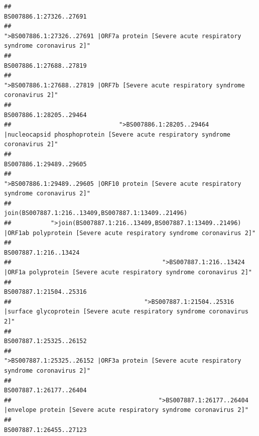 \documentclass[
]{article}
\begin{document}
\begin{verbatim}
##                                                                                                                BS007886.1:27326..27691 
##                                            ">BS007886.1:27326..27691 |ORF7a protein [Severe acute respiratory syndrome coronavirus 2]" 
##                                                                                                                BS007886.1:27688..27819 
##                                                    ">BS007886.1:27688..27819 |ORF7b [Severe acute respiratory syndrome coronavirus 2]" 
##                                                                                                                BS007886.1:28205..29464 
##                              ">BS007886.1:28205..29464 |nucleocapsid phosphoprotein [Severe acute respiratory syndrome coronavirus 2]" 
##                                                                                                                BS007886.1:29489..29605 
##                                            ">BS007886.1:29489..29605 |ORF10 protein [Severe acute respiratory syndrome coronavirus 2]" 
##                                                                                    join(BS007887.1:216..13409,BS007887.1:13409..21496) 
##           ">join(BS007887.1:216..13409,BS007887.1:13409..21496) |ORF1ab polyprotein [Severe acute respiratory syndrome coronavirus 2]" 
##                                                                                                                  BS007887.1:216..13424 
##                                          ">BS007887.1:216..13424 |ORF1a polyprotein [Severe acute respiratory syndrome coronavirus 2]" 
##                                                                                                                BS007887.1:21504..25316 
##                                     ">BS007887.1:21504..25316 |surface glycoprotein [Severe acute respiratory syndrome coronavirus 2]" 
##                                                                                                                BS007887.1:25325..26152 
##                                            ">BS007887.1:25325..26152 |ORF3a protein [Severe acute respiratory syndrome coronavirus 2]" 
##                                                                                                                BS007887.1:26177..26404 
##                                         ">BS007887.1:26177..26404 |envelope protein [Severe acute respiratory syndrome coronavirus 2]" 
##                                                                                                                BS007887.1:26455..27123 

\end{verbatim}
\end{document}
